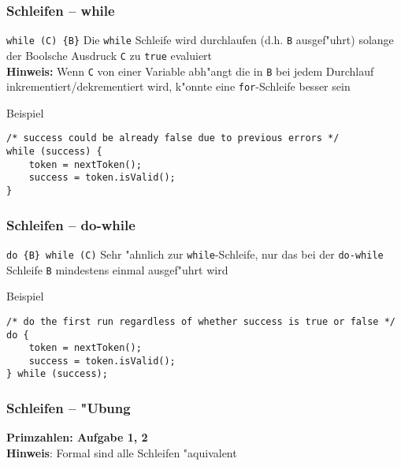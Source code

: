 \documentclass{beamer}
\begin{document}
\begin{frame}[containsverbatim]
\frametitle{Schleifen -- while}
\begin{block}{\texttt{while (C) \{B\}}}
Die \texttt{while} Schleife wird durchlaufen (d.h. \texttt{B} ausgef"uhrt) solange der Boolsche Ausdruck \texttt{C} zu \texttt{true} evaluiert\\[0.5em]
\textbf{Hinweis:} Wenn \texttt{C} von einer Variable abh"angt die in \texttt{B} bei jedem Durchlauf inkrementiert/dekrementiert wird, k"onnte eine \texttt{for}-Schleife besser sein
\end{block}

\begin{block}{Beispiel}
\begin{lstlisting}
/* success could be already false due to previous errors */
while (success) {
	token = nextToken();
	success = token.isValid();
}
\end{lstlisting}
\end{block}
\end{frame}


\begin{frame}[containsverbatim]
\frametitle{Schleifen -- do-while}
\begin{block}{\texttt{do \{B\} while (C)}}
Sehr "ahnlich zur \texttt{while}-Schleife, nur das bei der \texttt{do-while} Schleife \texttt{B} mindestens einmal ausgef"uhrt wird
\end{block}

\begin{block}{Beispiel}
\begin{lstlisting}
/* do the first run regardless of whether success is true or false */
do {
	token = nextToken();
	success = token.isValid();
} while (success);
\end{lstlisting}
\end{block}
\end{frame}


\begin{frame}
\frametitle{Schleifen -- "Ubung}
\begin{center}
\textbf{\Huge Primzahlen: Aufgabe 1, 2}\\[2em]
\textbf{Hinweis}: Formal sind alle Schleifen "aquivalent
\end{center}
\end{frame}
\end{document}
